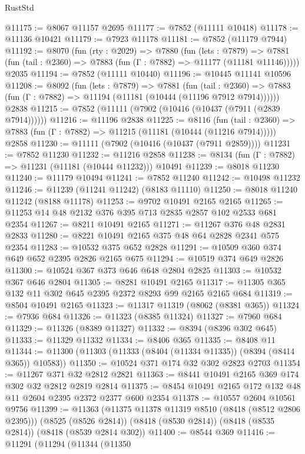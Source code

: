 \begin{lexlean}{RustStd}
\begin{coremodule}
@11175 := @8067 @11157 @2695
@11177 := @7852 (@11111 @10418)
@11178 := @11136 @10421
@11179 := @7923 @11178
@11181 := @7852 (@11179 @7944)
@11192 := @8070
    (fun (rty : @2029) =>
    @7880
      (fun (lets : @7879) =>
      @7881 (fun (tail : @2360) => @7883 (fun (Γ : @7882) => @11177 (@11181 @11146)))))
    @2035
@11194 := @7852 (@11111 @10440)
@11196 := @10445 @11141 @10596
@11208 := @8092
    (fun (lets : @7879) =>
    @7881
      (fun (tail : @2360) =>
      @7883 (fun (Γ : @7882) => @11194 (@11181 (@10444 (@11196 @7912 @7914))))))
    @2838
@11215 := @7852 (@11111 (@7902 (@10416 (@10437 (@7911 (@2839 @7914))))))
@11216 := @11196 @2838
@11225 := @8116
    (fun (tail : @2360) => @7883 (fun (Γ : @7882) => @11215 (@11181 (@10444 (@11216 @7914)))))
    @2858
@11230 := @11111 (@7902 (@10416 (@10437 (@7911 @2859))))
@11231 := @7852 @11230
@11232 := @11216 @2858
@11238 := @8134 (fun (Γ : @7882) => @11231 (@11181 (@10444 @11232))) @10491
@11239 := @8018 @11230
@11240 := @11179 @10494
@11241 := @7852 @11240
@11242 := @10498 @11232
@11246 := @11239 (@11241 @11242) (@8183 @11110)
@11250 := @8018 @11240 @11242 (@8188 @11178)
@11253 := @9702 @10491 @2165 @2165
@11265 := @11253 @14 @48 @2132 @376 @395 @713 @2835 @2857 @102 @2533 @681 @2354
@11267 := @8211 @10491 @2165
@11271 := @11267 @376 @48 @2831 @2833
@11280 := @8221 @10491 @2165 @375 @48 @64 @2828 @2341 @575 @2354
@11283 := @10532 @375 @652 @2828
@11291 := @10509 @360 @374 @649 @652 @2395 @2826 @2165 @675
@11294 := @10519 @374 @649 @2826
@11300 := @10524 @367 @373 @646 @648 @2804 @2825
@11303 := @10532 @367 @646 @2804
@11305 := @8281 @10491 @2165
@11317 := @11305 @365 @132 @11 @302 @645 @2395 @2372 @8293 @99 @2165 @2165 @684
@11319 := @8504 @10491 @2165
@11323 := @11317 @11319 (@8062 (@8381 @365))
@11324 := @7936 @684
@11326 := @11323 (@8385 @11324)
@11327 := @7960 @684
@11329 := @11326 (@8389 @11327)
@11332 := @8394 (@8396 @302 @645)
@11333 := @11329 @11332
@11334 := @8406 @365
@11335 := @8408 @11
@11344 := @11300 (@11303 (@11333 (@8404 (@11334 @11335)) (@8394 (@8414 @365)) @10583))
@11350 := @10524 @371 @174 @32 @302 @2823 @2703
@11354 := @11267 @371 @32 @2812 @2821
@11363 := @8441 @10491 @2165 @369 @174 @302 @32 @2812 @2819 @2814
@11375 := @8454 @10491 @2165 @172 @132 @48 @11 @2604 @2395 @2372 @2377 @600 @2354
@11378 := @10557 @2604 @10561 @9756
@11399 := @11363
    (@11375 @11378 @11319 @8510 (@8418 (@8512 @2806 @2395)))
    (@8525 (@8526 @2814))
    (@8418 (@8530 @2814))
    (@8418 (@8535 @2814))
    (@8418 (@8539 @2814 @302))
@11400 := @8544 @369
@11416 := @11291
    (@11294
      (@11344
        (@11350

\end{coremodule}
\end{lexlean}
